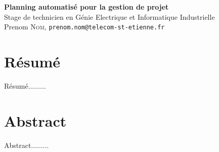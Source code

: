 \begin{center}
    \huge{\textbf{Planning automatisé pour la gestion de projet}}\\[0.1cm]
    \large Stage de technicien en Génie Electrique et Informatique Industrielle\\[5pt]
    \normalsize 
    Prenom \textsc{Nom}, \texttt{prenom.nom@telecom-st-etienne.fr}\\
\end{center}

\section*{Résumé}
Résumé.........


\section*{Abstract}
Abstract.........

